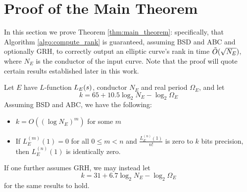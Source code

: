 
\section{Proof of the Main Theorem}\label{sec:main_thrm_proof}

In this section we prove Theorem \ref{thm:main_theorem}: specifically, that Algorithm \ref{algo:compute_rank} is guaranteed, assuming BSD and ABC and optionally GRH, to correctly output an elliptic curve's rank in time $\tilde{O}(\sqrt{N_E})$, where $N_E$ is the conductor of the input curve. Note that the proof will quote certain results established later in this work. \\

\begin{proposition}
\label{prop:k_bits_for_leading_coeff}
Let $E$ have $L$-function $L_E(s)$, conductor $N_E$ and real period $\Omega_E$, and let
\begin{equation}\label{eqn:num_bits_without_GRH}
k = 65 + 10.5 \log_2 N_E - \log_2 \Omega_E
\end{equation}
Assuming BSD and ABC, we have the following:
\begin{itemize}
\item $k = O((\log N_E)^m)$ for some $m$
\item If $L_E^{(m)}(1)=0$ for all $0 \le m < n$ and $\frac{L_E^{(n)}(1)}{n!}$ is zero to $k$ bits precision, then $L_E^{(n)}(1)$ is identically zero.
\end{itemize}
\end{proposition}
If one further assumes GRH, we may instead let
\begin{equation}\label{eqn:num_bits_with_GRH}
k = 31 + 6.7 \log_2 N_E - \log_2 \Omega_E
\end{equation}
for the same results to hold.
